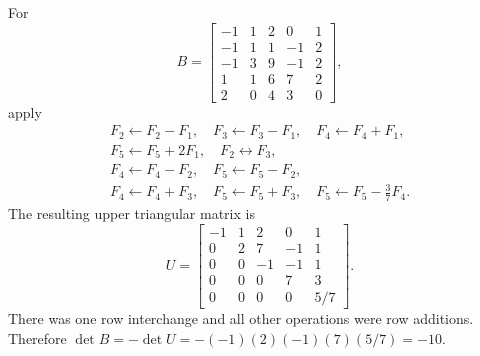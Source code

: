 \begin{enumerate}[label=\alph*)]
\begin{answer}
For
\[
 B=\begin{bmatrix}
-1&1&2&0&1\\-1&1&1&-1&2\\-1&3&9&-1&2\\1&1&6&7&2\\2&0&4&3&0
\end{bmatrix},
\]
apply
\[
\begin{gathered}
F_2\gets F_2-F_1,\quad F_3\gets F_3-F_1,\quad
F_4\gets F_4+F_1,\\
F_5\gets F_5+2F_1,\quad F_2\leftrightarrow F_3,\\
F_4\gets F_4-F_2,\quad F_5\gets F_5-F_2,\\
F_4\gets F_4+F_3,\quad F_5\gets F_5+F_3,\quad
F_5\gets F_5-\tfrac37F_4.
\end{gathered}
\]
The resulting upper triangular matrix is
\[
 U=\begin{bmatrix}
 -1&1&2&0&1\\0&2&7&-1&1\\0&0&-1&-1&1\\0&0&0&7&3\\0&0&0&0&5/7
 \end{bmatrix}.
\]
There was one row interchange and all other operations were row additions.
Therefore $\det B=-\det U=-(-1)(2)(-1)(7)(5/7)=-10$.
\end{answer}
\end{enumerate}

